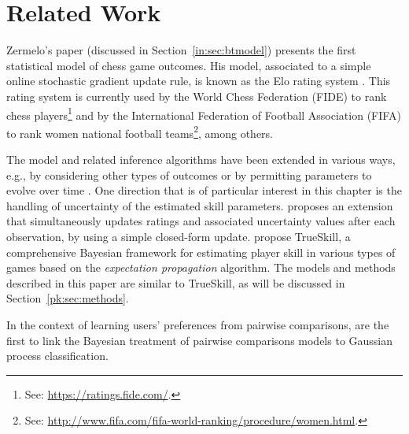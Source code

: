 \section{Related Work}
\label{pk:sec:relwork}

Zermelo's \citeyear{zermelo1928berechnung} paper (discussed in Section~\ref{in:sec:btmodel}) presents the first statistical model of chess game outcomes.
His model, associated to a simple online stochastic gradient update rule, is known as the Elo rating system \citep{elo1978rating}.
This rating system is currently used by the World Chess Federation (FIDE) to rank chess players\footnote{See: \url{https://ratings.fide.com/}.} and by the International Federation of Football Association (FIFA) to rank women national football teams\footnote{See: \url{http://www.fifa.com/fifa-world-ranking/procedure/women.html}.}, among others.

The model and related inference algorithms have been extended in various ways, e.g., by considering other types of outcomes \citep{rao1967ties, maher1982modelling} or by permitting parameters to evolve over time \citep{glickman1993paired, fahrmeir1994dynamic, cattelan2013dynamic}.
One direction that is of particular interest in this chapter is the handling of uncertainty of the estimated skill parameters.
\citet{glickman1999parameter} proposes an extension that simultaneously updates ratings and associated uncertainty values after each observation, by using a simple closed-form update.
\citet{herbrich2006trueskill} propose TrueSkill, a comprehensive Bayesian framework for estimating player skill in various types of games based on the \emph{expectation propagation} algorithm.
The models and methods described in this paper are similar to TrueSkill, as will be discussed in Section~\ref{pk:sec:methods}.

In the context of learning users' preferences from pairwise comparisons, \citet{chu2005preference} are the first to link the Bayesian treatment of pairwise comparisons models to Gaussian process classification.
